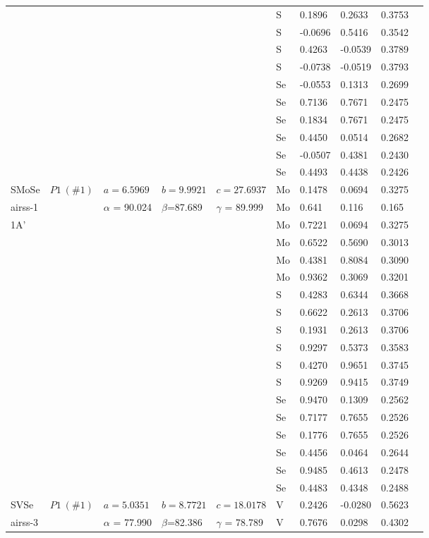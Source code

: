 \documentclass[a4paperm]{article}
\begin{document}
\begin{longtable}[c]{l*{9}{l}}
		&&&&&	S	&	0.1896	&	0.2633	&	0.3753	\\
		&&&&&	S	&	-0.0696	&	0.5416	&	0.3542	\\
		&&&&&	S	&	0.4263	&	-0.0539	&	0.3789	\\
		&&&&&	S	&	-0.0738	&	-0.0519	&	0.3793	\\
		&&&&&	Se	&	-0.0553	&	0.1313	&	0.2699	\\
		&&&&&	Se	&	0.7136	&	0.7671	&	0.2475	\\
		&&&&&	Se	&	0.1834	&	0.7671	&	0.2475	\\
		&&&&&	Se	&	0.4450	&	0.0514	&	0.2682	\\
		&&&&&	Se	&	-0.0507	&	0.4381	&	0.2430	\\
		&&&&&	Se	&	0.4493	&	0.4438	&	0.2426	\\
		\hline 
		SMoSe & $P1\ (\#1)$  &	$a=6.5969$ & $b=9.9921$ & $c=27.6937$  & Mo  &0.1478 &0.0694  &0.3275 \\
		airss-1&&$\alpha$ = 90.024& $\beta$=87.689& $\gamma$ = 89.999& Mo &0.641 &0.116 &0.165\\
		1A'&&&&&	Mo	&	0.7221	&	0.0694	&	0.3275	\\
		&&&&&	Mo	&	0.6522	&	0.5690	&	0.3013	\\
		&&&&&	Mo	&	0.4381	&	0.8084	&	0.3090	\\
		&&&&&	Mo	&	0.9362	&	0.3069	&	0.3201	\\
		&&&&&	S	&	0.4283	&	0.6344	&	0.3668	\\
		&&&&&	S	&	0.6622	&	0.2613	&	0.3706	\\
		&&&&&	S	&	0.1931	&	0.2613	&	0.3706	\\
		&&&&&	S	&	0.9297	&	0.5373	&	0.3583	\\
		&&&&&	S	&	0.4270	&	0.9651	&	0.3745	\\
		&&&&&	S	&	0.9269	&	0.9415	&	0.3749	\\
		&&&&&	Se	&	0.9470	&	0.1309	&	0.2562	\\
		&&&&&	Se	&	0.7177	&	0.7655	&	0.2526	\\
		&&&&&	Se	&	0.1776	&	0.7655	&	0.2526	\\
		&&&&&	Se	&	0.4456	&	0.0464	&	0.2644	\\
		&&&&&	Se	&	0.9485	&	0.4613	&	0.2478	\\
		&&&&&	Se	&	0.4483	&	0.4348	&	0.2488	\\
		\hline
		SVSe & $P1\ (\#1)$  &	$a=5.0351$ & $b=8.7721$ & $c=18.0178$  & V	&	0.2426	&	-0.0280	&	0.5623	\\
		airss-3&&$\alpha$ = 77.990& $\beta$=82.386& $\gamma$ = 78.789  & V	&	0.7676	&	0.0298	&	0.4302	\\		

\end{longtable}
\end{document}
